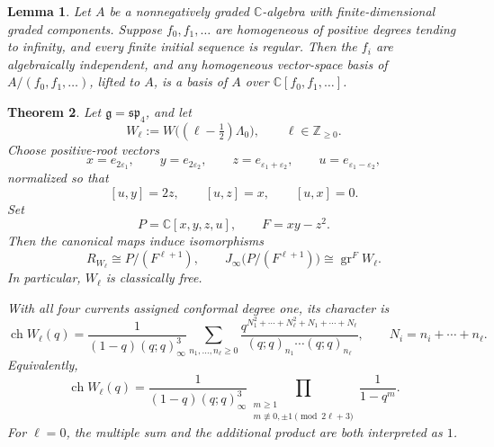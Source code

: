 \documentclass[11pt]{amsart}
\newtheorem{theorem}{Theorem}[section]
\newtheorem{lemma}[theorem]{Lemma}
\theoremstyle{definition}
\theoremstyle{remark}
\begin{document}
\begin{lemma} \label{sequence}
Let \(A\) be a nonnegatively graded \(\mathbb C\)-algebra with finite-dimensional graded components. Suppose \(f_0,f_1,\ldots\) are homogeneous of positive degrees tending to infinity, and every finite initial sequence is regular. Then the \(f_i\) are algebraically independent, and any homogeneous vector-space basis of \(A/(f_0,f_1,\ldots)\), lifted to \(A\), is a basis of \(A\) over \(\mathbb C[f_0,f_1,\ldots]\).
\end{lemma}

\begin{theorem}\label{thm:sp4-half-integral}
Let $\mathfrak g=\mathfrak{sp}_4$, and let
\[
 W_\ell:=W\bigl((\ell-\tfrac12)\Lambda_0\bigr),
 \qquad \ell\in\mathbb Z_{\ge0}.
\]
Choose positive-root vectors
\[
 x=e_{2\varepsilon_1},\qquad
 y=e_{2\varepsilon_2},\qquad
 z=e_{\varepsilon_1+\varepsilon_2},\qquad
 u=e_{\varepsilon_1-\varepsilon_2},
\]
normalized so that
\[
 [u,y]=2z,\qquad [u,z]=x,\qquad [u,x]=0.
\]
Set
\[
 P=\mathbb C[x,y,z,u],\qquad F=xy-z^2.
\]
Then the canonical maps induce isomorphisms
\[
 R_{W_\ell}\cong P/(F^{\ell+1}),
 \qquad
 J_\infty\bigl(P/(F^{\ell+1})\bigr)
 \cong \operatorname{gr}^{F}W_\ell.
\]
In particular, $W_\ell$ is classically free.

With all four currents assigned conformal degree one, its character is
\[
 \operatorname{ch}W_\ell(q)
 =
 \frac{1}{(1-q)(q;q)_\infty^3}
 \sum_{n_1,\ldots,n_\ell\ge0}
 \frac{
 q^{N_1^2+\cdots+N_\ell^2+N_1+\cdots+N_\ell}
 }{
 (q;q)_{n_1}\cdots(q;q)_{n_\ell}
 },
 \qquad
 N_i=n_i+\cdots+n_\ell.
\]
Equivalently,
\[
 \operatorname{ch}W_\ell(q)
 =
 \frac{1}{(1-q)(q;q)_\infty^3}
 \prod_{\substack{m\ge1\\
 m\not\equiv0,\pm1\pmod{2\ell+3}}}
 \frac{1}{1-q^m}.
\]
For $\ell=0$, the multiple sum and the additional product
are both interpreted as $1$.
\end{theorem}
\end{document}
